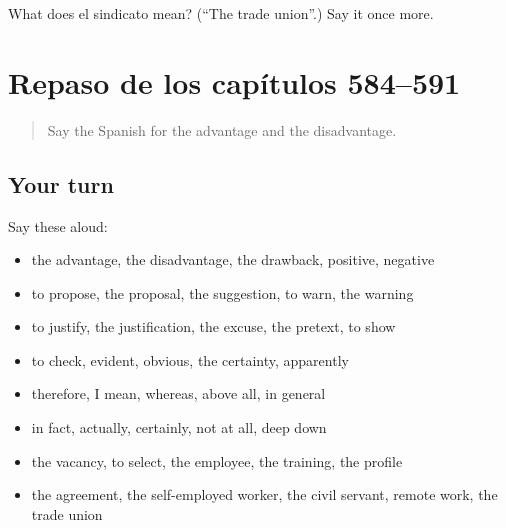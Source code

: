 \begin{tcolorbox}[breakable,colback=teal!4,colframe=teal!35!black,title={Before you move on}]
What does el sindicato mean? (\textquotedblleft{}The trade union\textquotedblright{}.) Say it once more.
\end{tcolorbox}
\section[(dialogue)]{Repaso de los capítulos 584–591}

\label{lesson:ES-R591-repaso-584-591}



\begin{quote}
Say the Spanish for the advantage and the disadvantage.
\end{quote}

\subsection*{Your turn}
Say these aloud:

\begin{itemize}
\raggedright
  \item the advantage, the disadvantage, the drawback, positive, negative
  \item to propose, the proposal, the suggestion, to warn, the warning
  \item to justify, the justification, the excuse, the pretext, to show
  \item to check, evident, obvious, the certainty, apparently
  \item therefore, I mean, whereas, above all, in general
  \item in fact, actually, certainly, not at all, deep down
  \item the vacancy, to select, the employee, the training, the profile
  \item the agreement, the self-employed worker, the civil servant, remote work, the trade union
\end{itemize}

